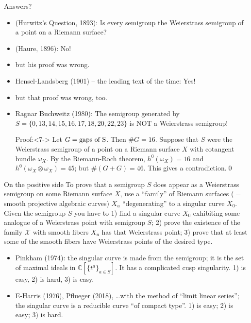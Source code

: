 \documentclass[12pt, aspectratio=169]{beamer}
\def\C{{\mathbb C}}
\begin{document}
\begin{frame}{Answers?}
 
\begin{itemize}
 \item<1-6> (Hurwitz's Question, 1893):\alert{ Is every semigroup the Weierstrass semigroup of a point
on a Riemann surface?}
\item <2-> \qquad (Haure, 1896): No!
\item<3-> \qquad\qquad but his proof was wrong.
\item<4-> \qquad Hensel-Landsberg (1901) -- the leading text of the time: Yes!
\item<5-> \qquad\qquad but that proof was wrong, too.
\item<6-> \qquad \alert{Ragnar Buchweitz} (1980): The semigroup generated by
$S = \{0, 13, 14, 15, 16, 17, 18, 20, 22, 23\} $ is NOT a Weierstrass semigroup! 
\smallskip

\alert{Proof:}<7-> Let $G= \hbox{gaps of S}$. Then $\#G = 16$. Suppose that $S$ were the Weierstrass semigroup
of a point on a Riemann surface $X$ with cotangent bundle $\omega_X$. By the Riemann-Roch theorem,
$h^0(\omega_X) = 16$ and $h^0(\omega_X\otimes \omega_X) = 45$; but $\#(G+G) = 46$. This gives a  contradiction.\qed
\end{itemize}
\end{frame}

\begin{frame}{On the positive side}
To prove that a semigroup $S$ does appear as a Weierstrass semigroup on some
Riemann surface $X$, use a ``family'' of
Riemann surfaces  ($=$ smooth projective algebraic curves) $X_u$ ``degenerating'' to a singular curve $X_0$.
 Given the semigroup $S$ you
have to 1) find a singular curve $X_0$ exhibiting some analogue of a Weierstrass point with semigroup $S$;
2) prove the existence of the family $\mathcal X$ with smooth fibers $X_u$ has that Weierstrass point;
3) prove that at least some of the smooth fibers have Weierstrass points of the desired type.

\begin{itemize}
 \item Pinkham (1974): the singular curve is made from the semigroup; it is the set 
of maximal ideals in $\C[\{t^a\}_{a\in S}]$. It has a complicated cusp singularity. 1) is easy, 2) is hard, 3) is easy.

\item E-Harris (1976), Pflueger (2018), \dots with the method of ``limit linear series''; the singular curve is a reducible curve ``of compact type''. 1) is easy; 2) is easy; 3) is hard.
\end{itemize}
\end{frame}
\end{document}
